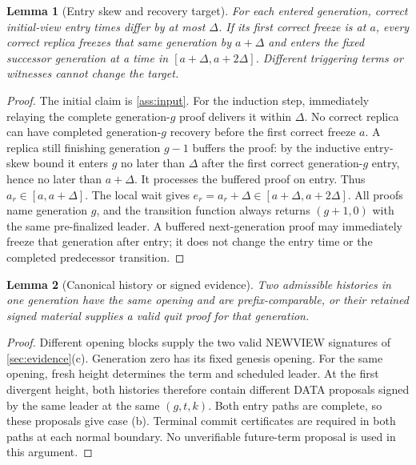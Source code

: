 \documentclass[11pt,a4paper]{article}
\newtheorem{lemma}[lemma]{Lemma}
\begin{document}
\begin{lemma}[Entry skew and recovery target]
\label{lem:entry}
For each entered generation, correct initial-view entry times differ by at
most $\Delta$. If its first correct freeze is at $a$, every correct replica
freezes that same generation by $a+\Delta$ and enters the fixed successor
generation at a time in $[a+\Delta,a+2\Delta]$. Different triggering terms
or witnesses cannot change the target.
\end{lemma}
\begin{proof}
The initial claim is \cref{ass:input}. For the induction step, immediately
relaying the complete generation-$g$ proof delivers it within $\Delta$.
No correct replica can have completed generation-$g$ recovery before the
first correct freeze $a$. A replica still finishing generation $g-1$
buffers the proof: by the inductive entry-skew bound it enters $g$ no
later than $\Delta$ after the first correct generation-$g$ entry, hence no
later than $a+\Delta$. It processes the buffered proof on entry. Thus
$a_r\in[a,a+\Delta]$. The local wait gives
$e_r=a_r+\Delta\in[a+\Delta,a+2\Delta]$. All proofs name generation $g$,
and the transition function always returns $(g+1,0)$ with the same
pre-finalized leader. A buffered next-generation proof may immediately
freeze that generation after entry; it does not change the entry time or
the completed predecessor transition.
\end{proof}

\begin{lemma}[Canonical history or signed evidence]
\label{lem:fork}
Two admissible histories in one generation have the same opening and are
prefix-comparable, or their retained signed material supplies a valid quit
proof for that generation.
\end{lemma}
\begin{proof}
Different opening blocks supply the two valid NEWVIEW signatures of
\cref{sec:evidence}(c). Generation zero has its fixed genesis opening.
For the same opening, fresh height determines the term and scheduled
leader. At the first divergent height, both histories therefore contain
different DATA proposals signed by the same leader at the same
$(g,t,k)$. Both entry paths are complete, so these proposals give case (b).
Terminal commit certificates are required in both paths at each normal
boundary. No unverifiable future-term proposal is used in this argument.
\end{proof}
\end{document}
